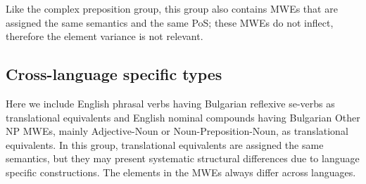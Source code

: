 \documentclass[output=paper]{langsci/langscibook}
\begin{document}
Like the complex preposition group, this group also contains MWEs that are
assigned the same semantics and the same PoS; these MWEs do not inflect,
therefore the element variance is not relevant.


\subsection{ Cross-language specific types}

Here we include English phrasal verbs having Bulgarian reflexive se-verbs as translational equivalents and English nominal compounds having Bulgarian \linebreak Other NP
MWEs, mainly Adjective-Noun or Noun-Preposition-Noun, as translational
equivalents.
In this group, translational equivalents are assigned the same semantics,
but they may present systematic structural differences due to language
specific constructions. The elements in the MWEs always differ across
languages.
\end{document}
